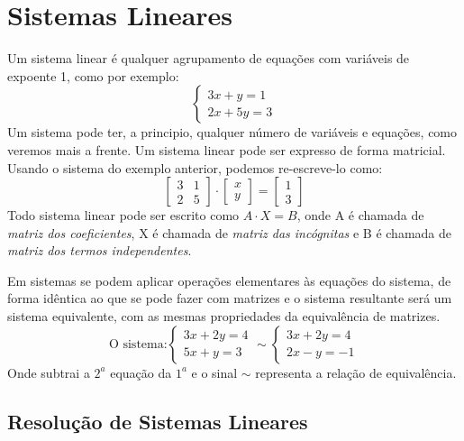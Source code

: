 \section{Sistemas Lineares}
\label{sec:sis}
Um sistema linear é qualquer agrupamento de equações com variáveis de expoente 1, como por exemplo:
\begin{displaymath}
\left\{
\begin{array}{l}
  3x+y=1\\2x+5y=3
\end{array}
\right.
\end{displaymath}
Um sistema pode ter, a principio, qualquer número de variáveis e equações, como veremos mais a frente.
Um sistema linear pode ser expresso de forma matricial. Usando o sistema do exemplo anterior, podemos re-escreve-lo como:
\[
\begin{bmatrix}
  3 & 1\\2 & 5 \end{bmatrix}
\cdot
\begin{bmatrix}
  x\\y \end{bmatrix}
=
\begin{bmatrix}
  1\\3 \end{bmatrix}
  \]
  Todo sistema linear pode ser escrito como $A\cdot X=B$, onde A é chamada de \textit{matriz dos coeficientes}, X é chamada de \textit{matriz das incógnitas} e B é chamada de \textit{matriz dos termos independentes}.
  
  Em sistemas se podem aplicar operações elementares às equações do sistema, de forma idêntica ao que se pode fazer com matrizes e o sistema resultante será um sistema equivalente, com as mesmas propriedades da equivalência de matrizes.
  \[\text{O sistema:}\left\{
  \begin{array}{l}
    3x+2y=4\\ 5x+y=3
  \end{array}\right.
  \sim
  \left\{
  \begin{array}{l}
    3x+2y=4\\ 2x-y=-1
  \end{array}\right.\]
  Onde subtrai a $2^a$ equação da $1^a$ e o sinal $\sim$ representa a relação de equivalência.
  \subsection{Resolução de Sistemas Lineares}
